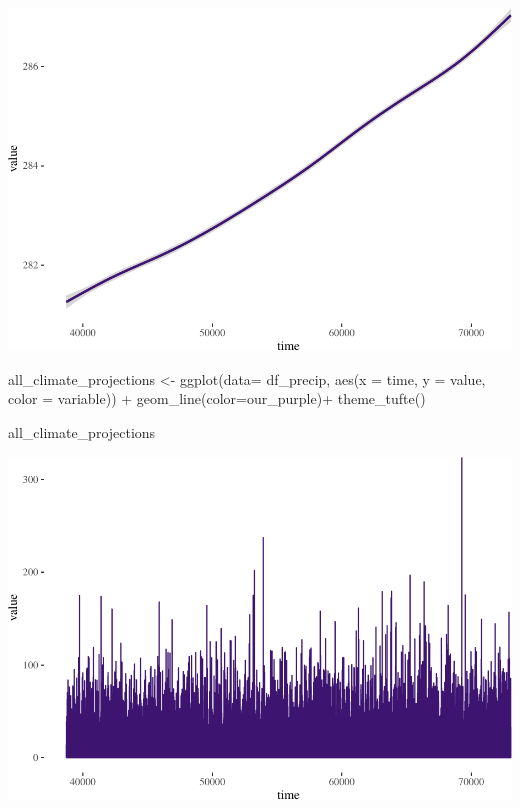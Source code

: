 \documentclass[
  paper=a4,
  ,captions=tableheading
]{scrartcl}
\newenvironment{Shaded}{\begin{snugshade}}{\end{snugshade}}
\newcommand{\AttributeTok}[1]{\textcolor[rgb]{0.77,0.63,0.00}{#1}}
\newcommand{\FunctionTok}[1]{\textcolor[rgb]{0.00,0.00,0.00}{#1}}
\newcommand{\NormalTok}[1]{#1}
\newcommand{\OtherTok}[1]{\textcolor[rgb]{0.56,0.35,0.01}{#1}}
\newcommand{\SpecialCharTok}[1]{\textcolor[rgb]{0.00,0.00,0.00}{#1}}
\begin{document}
\includegraphics{Haskell_files/figure-latex/unnamed-chunk-52-2.pdf}

\begin{Shaded}
\begin{Highlighting}[]
\NormalTok{all\_climate\_projections }\OtherTok{\textless{}{-}} \FunctionTok{ggplot}\NormalTok{(}\AttributeTok{data=}\NormalTok{ df\_precip, }\FunctionTok{aes}\NormalTok{(}\AttributeTok{x =}\NormalTok{ time, }\AttributeTok{y =}\NormalTok{ value, }\AttributeTok{color =}\NormalTok{ variable)) }\SpecialCharTok{+} 
  \FunctionTok{geom\_line}\NormalTok{(}\AttributeTok{color=}\NormalTok{our\_purple)}\SpecialCharTok{+}
  \FunctionTok{theme\_tufte}\NormalTok{()}
  

\NormalTok{all\_climate\_projections}
\end{Highlighting}
\end{Shaded}

\includegraphics{Haskell_files/figure-latex/unnamed-chunk-53-1.pdf}
\end{document}
